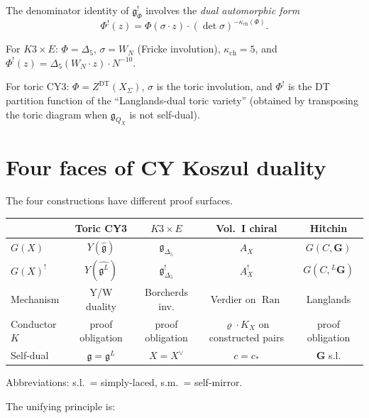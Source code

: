 \documentclass[11pt]{article}
\theoremstyle{definition}
\theoremstyle{remark}
\DeclareMathOperator{\Ran}{Ran}
\newcommand{\fkg}{\mathfrak{g}}
\begin{document}
The denominator identity of $\fkg_\Phi^!$ involves the
\emph{dual automorphic form}
\begin{equation}\label{eq:dual-automorphic}
\Phi^!(z) = \Phi(\sigma \cdot z) \cdot (\det \sigma)^{-\kappa_{\mathrm{ch}}(\Phi)}.
\end{equation}

For $K3 \times E$: $\Phi = \Delta_5$, $\sigma = W_N$ (Fricke
involution), $\kappa_{\mathrm{ch}} = 5$, and
$\Phi^!(z) = \Delta_5(W_N \cdot z) \cdot N^{-10}$.

For toric CY3: $\Phi = Z^{\mathrm{DT}}(X_\Sigma)$, $\sigma$ is the
toric involution, and $\Phi^!$ is the DT partition function of the
``Langlands-dual toric variety'' (obtained by transposing the toric
diagram when $\fkg_{Q_X}$ is not self-dual).


\section{Four faces of CY Koszul duality}
\label{sec:synthesis}

The four constructions have different proof surfaces.

\begin{center}
\renewcommand{\arraystretch}{1.4}
\begin{tabular}{lcccc}
& \textbf{Toric CY3} & \textbf{$K3 \times E$}
& \textbf{Vol.~I chiral} & \textbf{Hitchin} \\
\hline
$G(X)$ & $Y(\widehat{\fkg})$ & $\fkg_{\Delta_5}$
& $A_X$ & $G(C,\mathbf{G})$ \\
$G(X)^!$ & $Y(\widehat{\fkg^L})$ & $\fkg_{\Delta_5}^!$
& $A^!_X$ & $G(C,{}^L\mathbf{G})$ \\
Mechanism & Y/W duality & Borcherds inv.
& Verdier on $\Ran$ & Langlands \\
Conductor $K$ & proof obligation & proof obligation
& $\varrho \cdot K_X$ on constructed pairs & proof obligation \\
Self-dual & $\fkg = \fkg^L$ & $X = X^\vee$
& $c = c_*$ & $\mathbf{G}$ s.l. \\
\end{tabular}
\end{center}

\noindent Abbreviations: s.l.\ = simply-laced, s.m.\ = self-mirror.

\medskip

The unifying principle is:
\end{document}
